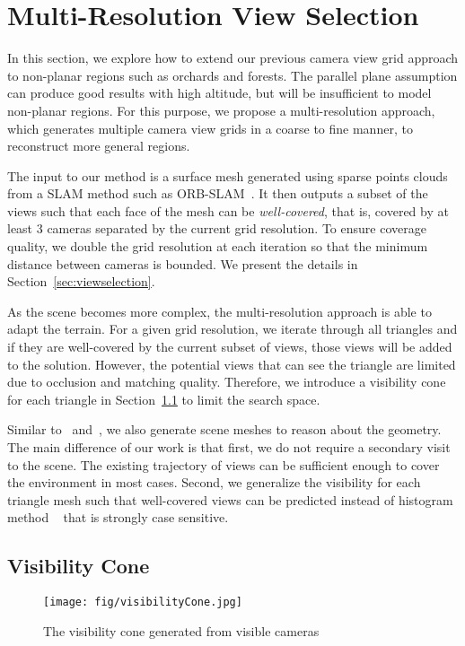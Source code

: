 \section{Multi-Resolution View Selection}
In this section, we explore how to extend our previous camera view grid approach to non-planar regions such as orchards and forests. The parallel plane assumption can produce good results with high altitude, but will be insufficient to model non-planar regions. For this purpose, we propose a multi-resolution approach, which generates multiple camera view grids in a coarse to fine manner, to reconstruct more general regions. 

The input to our method is a surface mesh generated using sparse points clouds from a SLAM method such as  ORB-SLAM~\cite{murORB2}. It then outputs a subset of the views such that each face of the mesh can be \emph{well-covered}, that is, covered by at least 3 cameras separated by the current grid resolution. To ensure coverage quality, we double the grid resolution at each iteration so that the minimum distance between cameras is bounded. We present the details in Section~\ref{sec:viewselection}.

As the scene becomes more complex, the multi-resolution approach is able to adapt the terrain. For a given grid resolution, we iterate through all triangles and if they are well-covered by the current subset of views, those views will be added to the solution. However, the potential views that can see the triangle are limited due to occlusion and matching quality. Therefore, we introduce a visibility cone for each triangle in Section~\ref{sec:mesh}  to limit the search space.  

Similar to~\cite{krause2014submodular} and~\cite{hoppe2012photogrammetric}, we also generate scene meshes to reason about the geometry. The main difference of our work is that first, we do not require a secondary visit to the scene. The existing trajectory of views can be sufficient enough to cover the environment in most cases.  Second, we generalize the visibility for each triangle mesh such that well-covered views can be predicted instead of histogram method ~\cite{hoppe2012photogrammetric} that is strongly case sensitive. 

\subsection{Visibility Cone}
\label{sec:mesh}

\begin{figure}
    \centering
    \texttt{[image: fig/visibilityCone.jpg]}
    \caption{The visibility cone generated from visible cameras}
    \label{fig:visibilitycone}
\end{figure}

